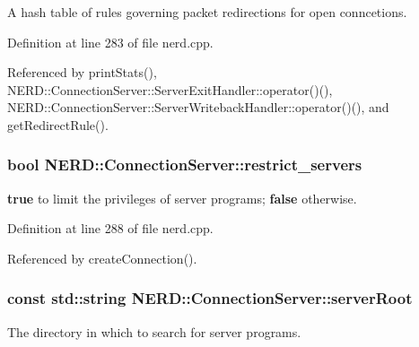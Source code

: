 \-A hash table of rules governing packet redirections for open conncetions. 



\-Definition at line 283 of file nerd.\-cpp.



\-Referenced by print\-Stats(), \-N\-E\-R\-D\-::\-Connection\-Server\-::\-Server\-Exit\-Handler\-::operator()(), \-N\-E\-R\-D\-::\-Connection\-Server\-::\-Server\-Writeback\-Handler\-::operator()(), and get\-Redirect\-Rule().

\hypertarget{classNERD_1_1ConnectionServer_ae54611cb80881c2a73d69e145df4bbd7}{
\subsubsection[{restrict\-\_\-servers}]{\setlength{\rightskip}{0pt plus 5cm}bool {\bf \-N\-E\-R\-D\-::\-Connection\-Server\-::restrict\-\_\-servers}}}
\label{classNERD_1_1ConnectionServer_ae54611cb80881c2a73d69e145df4bbd7}


{\bfseries true} to limit the privileges of server programs; {\bfseries false} otherwise. 



\-Definition at line 288 of file nerd.\-cpp.



\-Referenced by create\-Connection().

\hypertarget{classNERD_1_1ConnectionServer_a5e476e6dd3a15d073b4a3f75569dc240}{
\subsubsection[{server\-Root}]{\setlength{\rightskip}{0pt plus 5cm}const std\-::string {\bf \-N\-E\-R\-D\-::\-Connection\-Server\-::server\-Root}}}
\label{classNERD_1_1ConnectionServer_a5e476e6dd3a15d073b4a3f75569dc240}


\-The directory in which to search for server programs. 



